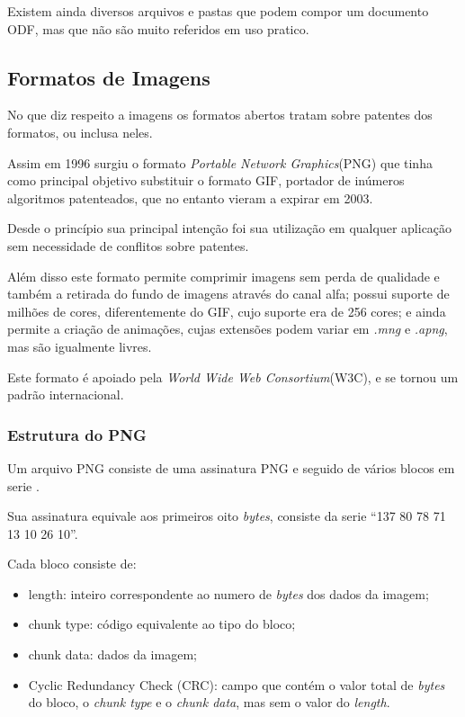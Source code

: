 Existem ainda diversos arquivos e pastas que podem compor um documento ODF, mas que não são muito referidos em uso pratico.


\subsection{Formatos de Imagens}

No que diz respeito a imagens os formatos abertos tratam sobre patentes dos formatos, ou inclusa neles.

Assim em 1996 surgiu o formato \textit{Portable Network Graphics}(PNG) que tinha como principal objetivo substituir o formato GIF, portador de inúmeros algoritmos patenteados, que no entanto vieram a expirar em 2003.

Desde o princípio sua principal intenção foi sua utilização em qualquer aplicação sem necessidade de conflitos sobre patentes.

Além disso este formato permite comprimir imagens sem perda de qualidade e também a retirada do fundo de imagens através do canal alfa; possui suporte de milhões de cores, diferentemente do GIF, cujo suporte era de 256 cores; e ainda permite a criação de animações, cujas extensões podem variar em \textit{.mng} e \textit{.apng}, mas são igualmente livres.

Este formato é apoiado pela \textit{World Wide Web Consortium}(W3C), e se tornou um padrão internacional.

\subsubsection{Estrutura do PNG}

Um arquivo PNG consiste de uma assinatura PNG e seguido de vários blocos em serie \cite{PNG-BOOK}.

Sua assinatura equivale aos primeiros oito \textit{bytes}, consiste da serie “137 80 78 71 13 10 26 10”.

Cada bloco consiste de:

\begin{itemize}
    \item{length: inteiro correspondente ao numero de \textit{bytes} dos dados da imagem;}
    \item{chunk type: código equivalente ao tipo do bloco;}
    \item{chunk data: dados da imagem;}
    \item{Cyclic Redundancy Check (CRC): campo que contém o valor total de \textit{bytes} do bloco, o \textit{chunk type} e o \textit{chunk data}, mas sem o valor do \textit{length}.}
\end{itemize}

